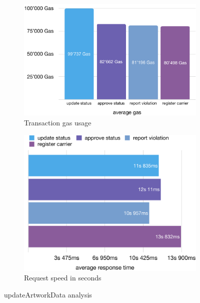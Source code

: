 \begin{figure}[ht]
    \begin{subfigure}{0.49\textwidth}
        \includegraphics[width=\textwidth]{diagrams/updateArtworkData_gas_eval.pdf}
        \caption{Transaction gas usage}
        \label{fig:updateArtworkData_tx_cost}
    \end{subfigure}
    \hfill
    \begin{subfigure}{0.49\textwidth}
        \includegraphics[width=\textwidth]{diagrams/updateArtworkData_request_time_eval.pdf}
        \caption{Request speed in seconds}
        \label{fig:updateArtworkData_tx_speed}
    \end{subfigure}
    \caption{updateArtworkData analysis}
    \label{fig:updateArtworkData_analysis}
\end{figure}

